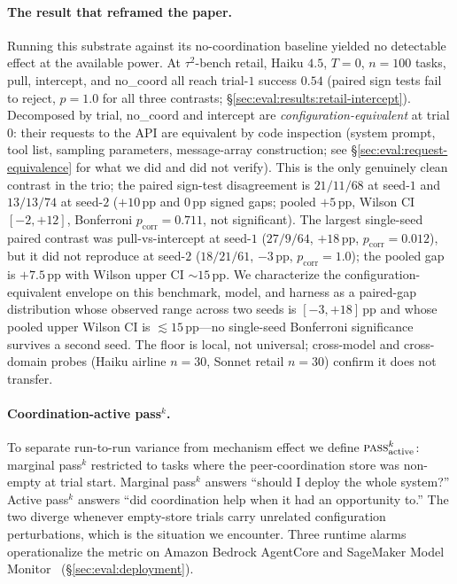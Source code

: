 \paragraph{The result that reframed the paper.}
Running this substrate against its no-coordination baseline
yielded no detectable effect at the available power. At
$\tau^2$-bench retail, Haiku $4.5$, $T{=}0$, $n{=}100$ tasks,
pull, intercept, and no\_coord all reach trial-$1$ success
$0.54$ (paired sign tests fail to reject, $p{=}1.0$ for all
three contrasts;
\S\ref{sec:eval:results:retail-intercept}).
Decomposed by trial, no\_coord and intercept are
\emph{configuration-equivalent} at trial $0$: their requests to
the API are equivalent by code inspection (system prompt, tool
list, sampling parameters, message-array construction; see
\S\ref{sec:eval:request-equivalence} for what we did and did not
verify). This is the only genuinely clean contrast in the
trio; the paired sign-test disagreement is $21/11/68$ at
seed-$1$ and $13/13/74$ at seed-$2$ ($+10$\,pp and $0$\,pp
signed gaps; pooled $+5$\,pp, Wilson CI $[{-}2,{+}12]$,
Bonferroni $p_{\text{corr}}{=}0.711$, not significant). The
largest single-seed paired contrast was pull-vs-intercept at
seed-$1$ ($27/9/64$, $+18$\,pp, $p_{\text{corr}}{=}0.012$),
but it did not reproduce at seed-$2$ ($18/21/61$, $-3$\,pp,
$p_{\text{corr}}{=}1.0$); the pooled gap is
$+7.5$\,pp with Wilson upper CI ${\sim}15$\,pp. We characterize
the configuration-equivalent envelope on this benchmark, model,
and harness as a paired-gap distribution whose observed range
across two seeds is $[{-}3,{+}18]$\,pp and whose pooled upper
Wilson CI is $\lesssim 15$\,pp---no single-seed Bonferroni
significance survives a second seed. The floor is local,
not universal; cross-model and cross-domain probes (Haiku
airline $n{=}30$, Sonnet retail $n{=}30$) confirm it does not
transfer.

\paragraph{Coordination-active pass$^k$.}
To separate run-to-run variance from mechanism effect we define
$\textsc{pass}^k_{\textrm{active}}$: marginal pass$^k$
restricted to tasks where the peer-coordination store was
non-empty at trial start. Marginal pass$^k$ answers ``should I
deploy the whole system?'' Active pass$^k$ answers ``did
coordination help when it had an opportunity to.'' The two
diverge whenever empty-store trials carry unrelated
configuration perturbations, which is the situation we encounter.
Three runtime alarms operationalize the metric on Amazon Bedrock
AgentCore and SageMaker Model
Monitor~\cite{sagemaker_monitor2022}
(\S\ref{sec:eval:deployment}).

